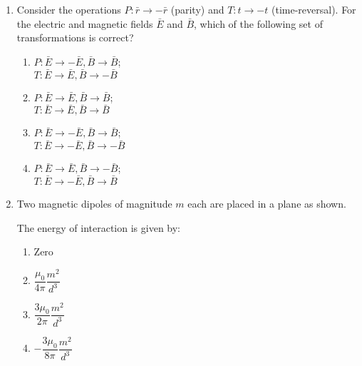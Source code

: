 \documentclass[journal]{IEEEtran}
\begin{document}
\begin{enumerate}[start=27]
\item Consider the operations $P: \bar{r} \rightarrow -\bar{r}$ (parity) and $T: t \rightarrow -t$ (time-reversal). For the electric and magnetic fields $\bar{E}$ and $\bar{B}$, which of the following set of transformations is correct?
\begin{multicols}{2}
\begin{enumerate}
\item $P: \bar{E} \rightarrow -\bar{E}, \bar{B} \rightarrow \bar{B}$;\\ $T: \bar{E} \rightarrow \bar{E}, \bar{B} \rightarrow -\bar{B}$
\item $P: \bar{E} \rightarrow \bar{E}, \bar{B} \rightarrow \bar{B}$;\\ $T: \bar{E} \rightarrow \bar{E}, \bar{B} \rightarrow \bar{B}$
\item $P: \bar{E} \rightarrow -\bar{E}, \bar{B} \rightarrow \bar{B}$;\\ $T: \bar{E} \rightarrow -\bar{E}, \bar{B} \rightarrow -\bar{B}$
\item $P: \bar{E} \rightarrow \bar{E}, \bar{B} \rightarrow -\bar{B}$; \\$T: \bar{E} \rightarrow -\bar{E}, \bar{B} \rightarrow \bar{B}$
\end{enumerate}
\end{multicols}

\item Two magnetic dipoles of magnitude $m$ each are placed in a plane as shown.
\begin{figure}[H]
\centering
{}%
\label{fig:my_label}
\end{figure}

The energy of interaction is given by:
\begin{multicols}{2}
\begin{enumerate}
\item Zero
\item $\dfrac{\mu_0}{4\pi} \dfrac{m^2}{d^3}$
\item $\dfrac{3\mu_0}{2\pi} \dfrac{m^2}{d^3}$
\item $-\dfrac{3\mu_0}{8\pi} \dfrac{m^2}{d^3}$
\end{enumerate}
\end{multicols}


\end{enumerate}
\end{document}
